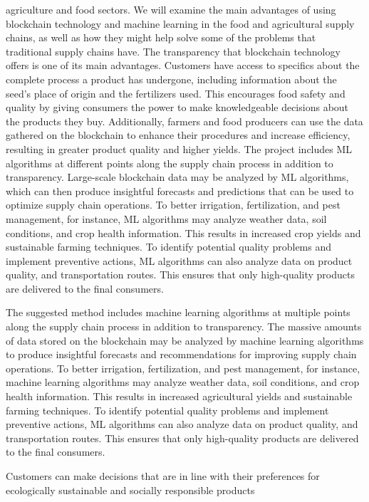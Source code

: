 agriculture and food sectors. We will examine the main advantages of using blockchain technology and machine learning in the 
food and agricultural supply chains, as well as how they might help solve some of the problems that traditional supply chains have.
The transparency that blockchain technology offers is one of its main advantages. Customers have access to specifics about the 
complete process a product has undergone, including information about the seed's place of origin and the fertilizers used. This 
encourages food safety and quality by giving consumers the power to make knowledgeable decisions about the products they buy. 
Additionally, farmers and food producers can use the data gathered on the blockchain to enhance their procedures and increase
efficiency, resulting in greater product quality and higher yields. The project includes ML algorithms at different points along the 
supply chain process in addition to transparency. Large-scale blockchain data may be analyzed by ML algorithms, which can then 
produce insightful forecasts and predictions that can be used to optimize supply chain operations. To better irrigation, fertilization, 
and pest management, for instance, ML algorithms may analyze weather data, soil conditions, and crop health information. This 
results in increased crop yields and sustainable farming techniques. To identify potential quality problems and implement preventive 
actions, ML algorithms can also analyze data on product quality, and transportation routes. This ensures that only high-quality 
products are delivered to the final consumers.
\par The suggested method includes machine learning algorithms at multiple points along the supply chain process in addition to 
transparency. The massive amounts of data stored on the blockchain may be analyzed by machine learning algorithms to produce 
insightful forecasts and recommendations for improving supply chain operations. To better irrigation, fertilization, and pest 
management, for instance, machine learning algorithms may analyze weather data, soil conditions, and crop health information. 
This results in increased agricultural yields and sustainable farming techniques. To identify potential quality problems and 
implement preventive actions, ML algorithms can also analyze data on product quality, and transportation routes. This ensures that 
only high-quality products are delivered to the final consumers.
\par Customers can make decisions that are in line with their preferences for ecologically sustainable and socially responsible products 
